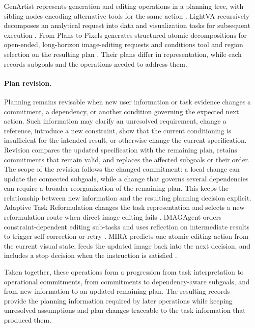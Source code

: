 GenArtist represents generation and editing operations in a planning tree, with sibling nodes encoding alternative tools for the same action \cite{wang2024genartist}. LightVA recursively decomposes an analytical request into data and visualization tasks for subsequent execution \cite{zhao2024lightva}. From Plans to Pixels generates structured atomic decompositions for open-ended, long-horizon image-editing requests and conditions tool and region selection on the resulting plan \cite{avg260515181}. Their plans differ in representation, while each records subgoals and the operations needed to address them.

\paragraph{Plan revision.}
Planning remains revisable when new user information or task evidence changes a commitment, a dependency, or another condition governing the expected next action. Such information may clarify an unresolved requirement, change a reference, introduce a new constraint, show that the current conditioning is insufficient for the intended result, or otherwise change the current specification. Revision compares the updated specification with the remaining plan, retains commitments that remain valid, and replaces the affected subgoals or their order. The scope of the revision follows the changed commitment: a local change can update the connected subgoals, while a change that governs several dependencies can require a broader reorganization of the remaining plan. This keeps the relationship between new information and the resulting planning decision explicit. Adaptive Task Reformulation changes the task representation and selects a new reformulation route when direct image editing fails \cite{avg260415917}. IMAGAgent orders constraint-dependent editing sub-tasks and uses reflection on intermediate results to trigger self-correction or retry \cite{avg260329602}. MIRA predicts one atomic editing action from the current visual state, feeds the updated image back into the next decision, and includes a stop decision when the instruction is satisfied \cite{avg251121087}.

Taken together, these operations form a progression from task interpretation to operational commitments, from commitments to dependency-aware subgoals, and from new information to an updated remaining plan. The resulting records provide the planning information required by later operations while keeping unresolved assumptions and plan changes traceable to the task information that produced them.



